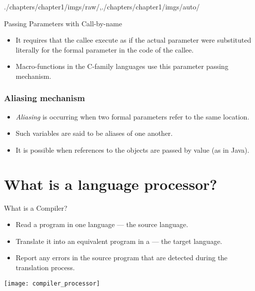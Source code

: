 \begin{graphicspathcontext}{{./chapters/chapter1/imgs/raw/},{./chapters/chapter1/imgs/auto/}}
\begin{bibunit}[apalike]
\begin{frame}{{Passing Parameters} with Call-by-name}
	\begin{itemize}
	\item It requires that the callee execute as if the actual parameter were substituted literally for the formal parameter in the code of the callee.
	\vfill
	\item Macro-functions in the C-family languages use this parameter passing mechanism.
	\end{itemize}
\end{frame}

\subsubsection{Aliasing mechanism}
\begin{frame}{\subsubsecname}
	\begin{itemize}
	\item \emph{Aliasing} is occurring when two formal parameters refer to the same location.
	\item Such variables are said to be aliases of one another.
	\vfill
	\item It is possible when references to the objects are passed by value (as in Java).
	\end{itemize}
\end{frame}

\section[Language processor]{What is a language processor?}

\tableofcontentslide[sectionstyle={show/shaded},subsectionstyle={hide/hide/hide},subsubsectionstyle={hide/hide/hide/hide}]

\begin{frame}{What is a Compiler?}
	\begin{itemize}
	\item Read a program in one language --- the source language.
	\item Translate it into an equivalent program in a  --- the target language.
	\vfill
	\item Report any errors in the source program that are detected during the translation process.
	\end{itemize}
	\vfill
	\begin{center}
		\texttt{[image: compiler\_processor]}
	\end{center}
\end{frame}


\end{bibunit}
\end{graphicspathcontext}
